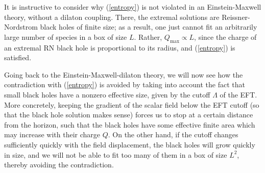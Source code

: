 \documentclass[11pt]{article}
\numberwithin{equation}{section}
\newcommand{\eq}[1]{(\ref{#1})}
\numberwithin{equation}{section}
\theoremstyle{remark}
\begin{document}
It is instructive to consider why \eq{entropy} is not violated in an Einstein-Maxwell theory, without a dilaton coupling. There, the extremal solutions are Reissner-Nordstrom black holes of finite size; as a result, one just cannot fit an arbitrarily large number of species in a box of size $L$. Rather, $Q_{\text{max}}\propto L$, since the charge of an extremal RN black hole is proportional to its radius, and \eq{entropy} is satisfied.


Going back to the Einstein-Maxwell-dilaton theory, we will now see how the contradiction with \eq{entropy} is avoided by taking into account the fact that small black holes have a nonzero effective size, given by the cutoff $\Lambda$ of the EFT. More concretely, keeping the gradient of the scalar field below the EFT cutoff (so that the black hole solution makes sense) forces us to stop at a certain distance from the horizon, such that the black holes have some effective finite area which may increase with their charge $Q$.
On the other hand, if the cutoff changes sufficiently quickly with the field displacement, the black holes will grow quickly in size, and we will not be able to fit too many of them in a box of size $L^2$, thereby avoiding the contradiction.
\end{document}
